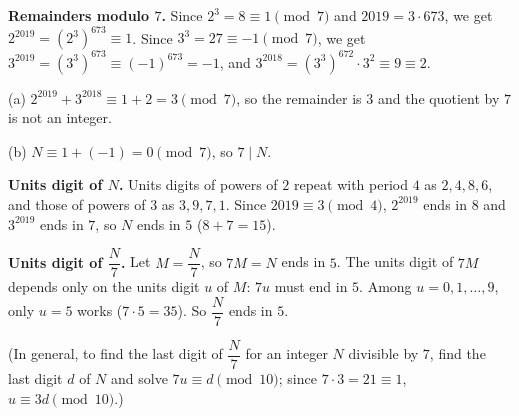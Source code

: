 \textbf{Remainders modulo $7$.} Since $2^3=8\equiv1\pmod7$ and $2019=3\cdot673$, we get $2^{2019}=(2^3)^{673}\equiv1$. Since $3^3=27\equiv-1\pmod7$, we get $3^{2019}=(3^3)^{673}\equiv(-1)^{673}=-1$, and $3^{2018}=(3^3)^{672}\cdot3^2\equiv9\equiv2$.

(a) $2^{2019}+3^{2018}\equiv1+2=3\pmod7$, so the remainder is $3$ and the quotient by $7$ is not an integer.

(b) $N\equiv1+(-1)=0\pmod7$, so $7\mid N$.

\textbf{Units digit of $N$.} Units digits of powers of $2$ repeat with period $4$ as $2,4,8,6$, and those of powers of $3$ as $3,9,7,1$. Since $2019\equiv3\pmod4$, $2^{2019}$ ends in $8$ and $3^{2019}$ ends in $7$, so $N$ ends in $5$ ($8+7=15$).

\textbf{Units digit of $\dfrac {N}{7}$.} Let $M=\dfrac {N}{7}$, so $7M=N$ ends in $5$. The units digit of $7M$ depends only on the units digit $u$ of $M$: $7u$ must end in $5$. Among $u=0,1,\dots,9$, only $u=5$ works ($7\cdot5=35$). So $\dfrac {N}{7}$ ends in $\boxed{5}$.

(In general, to find the last digit of $\dfrac {N}{7}$ for an integer $N$ divisible by $7$, find the last digit $d$ of $N$ and solve $7u\equiv d\pmod{10}$; since $7\cdot3=21\equiv1$, $u\equiv3d\pmod{10}$.)
